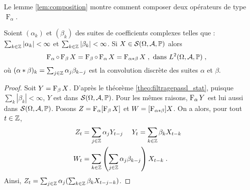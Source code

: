 Le lemme \ref{lem:composition} montre comment composer deux op\'erateurs
de type $\operatorname{F}_\alpha$.

\begin{lemma}\label{lem:composition}
  Soient $(\alpha_k)$ et $(\beta_k)$ des suites de coefficients complexes
  telles que : $\sum_{k\in\mathbb{Z}}|\alpha_k|<\infty$ et
  $\sum_{k\in\mathbb{Z}}|\beta_k|<\infty$.  Si $X\in\mathcal{S}(\Omega,\mathcal{A},\mathbb{P})$ alors
$$
\operatorname{F}_{\alpha} \circ \operatorname{F}_{\beta}X = \operatorname{F}_{\beta} \circ \operatorname{F}_{\alpha} X =  \operatorname{F}_{\alpha * \beta} X\;, \textrm{
  dans } L^2(\Omega,\mathcal{A},\mathbb{P})\;,\;
$$
o\`u $(\alpha*\beta)_k=\sum_{j\in\mathbb{Z}}\alpha_j\beta_{k-j}$ est la convolution discrète des suites $\alpha$ et $\beta$.
\end{lemma}

 \begin{proof}
 Soit $Y=\operatorname{F}_{\beta}X$. D'apr\`es le th\'eor\`eme \ref{theo:filtragepassl_stat},
puisque $\sum_k|\beta_k|<\infty$, $Y$ est dans $\mathcal{S}(\Omega,\mathcal{A},\mathbb{P})$.
Pour les m\^{e}mes raisons, $\operatorname{F}_{\alpha}Y$ est lui aussi dans $\mathcal{S}(\Omega,\mathcal{A},\mathbb{P})$.
Posons $Z=\operatorname{F}_{\alpha}[\operatorname{F}_{\beta}X]$ et $W=[\operatorname{F}_{\alpha * \beta}]X$. On a alors, pour tout $t\in\mathbb{Z}$,
\begin{align*}
Z_t &=\sum_{j\in\mathbb{Z}}\alpha_j Y_{t-j} \; \quad Y_t=\sum_{k\in\mathbb{Z}}\beta_k X_{t-k} \\
W_t &=\sum_{k\in\mathbb{Z}}\left(\sum_{j\in\mathbb{Z}}\alpha_j\beta_{k-j}\right)X_{t-k} \;.
\end{align*}
Ainsi,
$Z_t=\sum_{j\in\mathbb{Z}}\alpha_j(\sum_{k\in\mathbb{Z}}\beta_k X_{t-j-k})$.


\end{proof}
